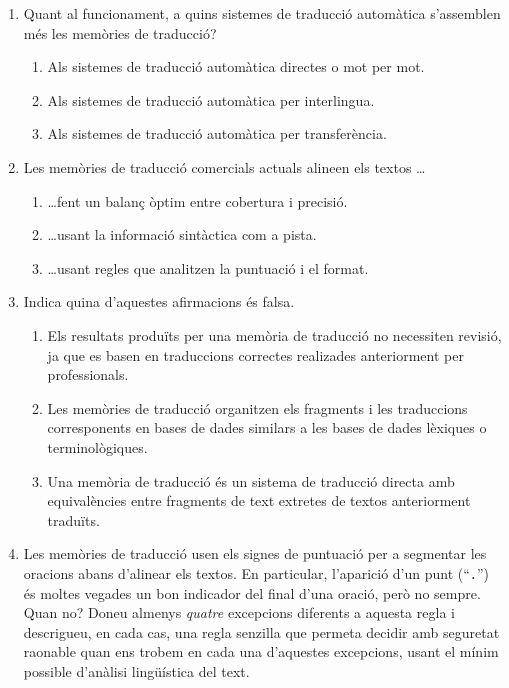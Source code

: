 \begin{enumerate}
\item Quant al funcionament, 
a quins sistemes de traducció automàtica s'assemblen més les
memòries de traducció?
\begin{enumerate}
\item Als sistemes de traducció automàtica directes o mot per mot.
\item Als sistemes de traducció automàtica per interlingua.
\item Als sistemes de traducció automàtica per transferència.
\end{enumerate}
\item Les memòries de traducció comercials actuals alineen els textos
{\ldots}
\begin{enumerate}
\item {\ldots}fent un balanç òptim entre cobertura i precisió.
\item {\ldots}usant la informació sintàctica com a pista.
\item {\ldots}usant regles que analitzen la puntuació i el format.
\end{enumerate}

\item Indica quina d'aquestes afirmacions és falsa.
\begin{enumerate}
\item Els resultats produïts per una memòria de traducció no
     necessiten revisió, ja que es basen en traduccions correctes realizades
     anteriorment per professionals.
\item Les memòries de traducció organitzen els fragments i les
     traduccions corresponents en bases
     de dades similars a les bases de dades lèxiques o terminològiques.
\item Una memòria de traducció és un sistema de traducció
     directa amb equivalències entre fragments de text 
     extretes de textos anteriorment traduïts.
\end{enumerate}

\item Les memòries de traducció usen els signes de puntuació per a 
     segmentar les oracions abans d'alinear els textos. En particular,
     l'aparició d'un punt (``\texttt{.}'') és moltes vegades un bon  
     indicador del final d'una oració, però no sempre. Quan no? Doneu
     almenys \emph{quatre} excepcions diferents a aquesta regla i   
     descrigueu, en cada cas, una regla senzilla que permeta decidir
     amb seguretat raonable quan ens trobem en cada una d'aquestes
     excepcions, usant el mínim possible d'anàlisi lingüística del
     text.


\end{enumerate}
